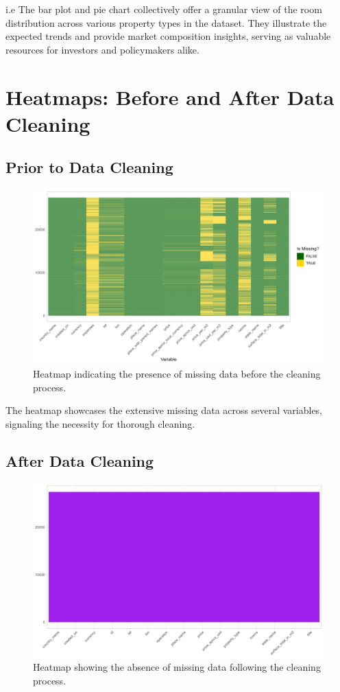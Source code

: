 \documentclass{article}
\begin{document}
i.e The bar plot and pie chart collectively offer a granular view of the room distribution across various property types in the dataset. They illustrate the expected trends and provide market composition insights, serving as valuable resources for investors and policymakers alike.



\section{Heatmaps: Before and After Data Cleaning}
\subsection{Prior to Data Cleaning}
\begin{figure}[H]
\centering
\includegraphics[width=\textwidth]{PS6a_Olubayode.png}
\caption{Heatmap indicating the presence of missing data before the cleaning process.}
\end{figure}

The heatmap showcases the extensive missing data across several variables, signaling the necessity for thorough cleaning.

\subsection{After Data Cleaning}
\begin{figure}[H]
\centering
\includegraphics[width=\textwidth]{PS6e_Olubayode.png}
\caption{Heatmap showing the absence of missing data following the cleaning process.}
\end{figure}
\end{document}
